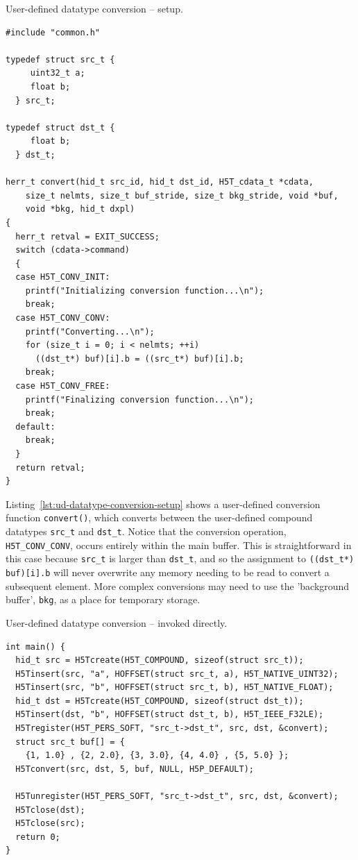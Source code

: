\begin{listing}
\centering
\caption{User-defined datatype conversion -- setup.}
\label{lst:ud-datatype-conversion-setup}
\begin{verbatim}
#include "common.h"

typedef struct src_t {
     uint32_t a;
     float b;
  } src_t;

typedef struct dst_t {
     float b;
  } dst_t;

herr_t convert(hid_t src_id, hid_t dst_id, H5T_cdata_t *cdata,
    size_t nelmts, size_t buf_stride, size_t bkg_stride, void *buf,
    void *bkg, hid_t dxpl)
{
  herr_t retval = EXIT_SUCCESS;
  switch (cdata->command)
  {
  case H5T_CONV_INIT:
    printf("Initializing conversion function...\n");
    break;
  case H5T_CONV_CONV:
    printf("Converting...\n");
    for (size_t i = 0; i < nelmts; ++i)
      ((dst_t*) buf)[i].b = ((src_t*) buf)[i].b;
    break;
  case H5T_CONV_FREE:
    printf("Finalizing conversion function...\n");
    break;
  default:
    break;
  }
  return retval;
}
\end{verbatim}
\end{listing}

Listing~\ref{lst:ud-datatype-conversion-setup} shows a user-defined conversion function \texttt{convert()}, which converts between the user-defined compound datatypes \texttt{src\_t} and \texttt{dst\_t}. Notice that the conversion operation, \texttt{H5T\_CONV\_CONV}, occurs entirely within the main buffer. This is straightforward in this case because \texttt{src\_t} is larger than \texttt{dst\_t}, and so the assignment to \texttt{((dst\_t*) buf)[i].b} will never overwrite any memory needing to be read to convert a subsequent element. More complex conversions may need to use the 'background buffer', \texttt{bkg}, as a place for temporary storage.

\begin{listing}
\centering
\caption{User-defined datatype conversion -- invoked directly.}
\label{lst:ud-datatype-conversion-direct}
\begin{verbatim}
int main() {
  hid_t src = H5Tcreate(H5T_COMPOUND, sizeof(struct src_t));
  H5Tinsert(src, "a", HOFFSET(struct src_t, a), H5T_NATIVE_UINT32);
  H5Tinsert(src, "b", HOFFSET(struct src_t, b), H5T_NATIVE_FLOAT);
  hid_t dst = H5Tcreate(H5T_COMPOUND, sizeof(struct dst_t));
  H5Tinsert(dst, "b", HOFFSET(struct dst_t, b), H5T_IEEE_F32LE);
  H5Tregister(H5T_PERS_SOFT, "src_t->dst_t", src, dst, &convert);
  struct src_t buf[] = {
    {1, 1.0} , {2, 2.0}, {3, 3.0}, {4, 4.0} , {5, 5.0} };  
  H5Tconvert(src, dst, 5, buf, NULL, H5P_DEFAULT);
  
  H5Tunregister(H5T_PERS_SOFT, "src_t->dst_t", src, dst, &convert); 
  H5Tclose(dst);
  H5Tclose(src);
  return 0;
}
\end{verbatim}
\end{listing}

